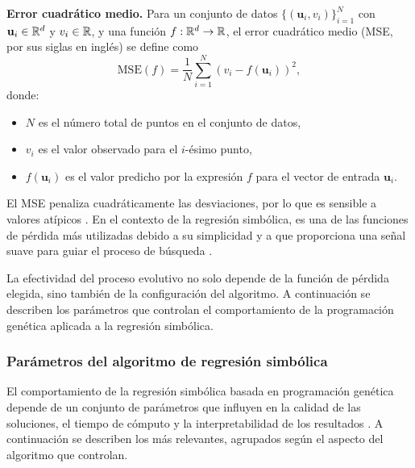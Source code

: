\documentclass[12pt,a4paper]{article} \usepackage[utf8]{inputenc} \usepackage[spanish]{babel} \usepackage{amsmath, amssymb, amsthm} \usepackage{bm} \usepackage{float} \usepackage{longtable} \usepackage[hidelinks]{hyperref}
\begin{document}
\textbf{Error cuadrático medio.} Para un conjunto de datos \(\{(\mathbf{u}_i, v_i)\}_{i=1}^{N}\) con \(\mathbf{u}_i \in \mathbb{R}^d\) y \(v_i \in \mathbb{R}\), y una función \(f: \mathbb{R}^d \to \mathbb{R}\), el error cuadrático medio (MSE, por sus siglas en inglés) se define como
\begin{equation}
 \text{MSE}(f) = \frac{1}{N} \sum_{i=1}^{N} \left( v_i - f(\mathbf{u}_i) \right)^2,
\end{equation}
donde:
\begin{itemize}
 \item \(N\) es el número total de puntos en el conjunto de datos, \item \(v_i\) es el valor observado para el \(i\)-ésimo punto, \item \(f(\mathbf{u}_i)\) es el valor predicho por la expresión \(f\) para el vector de entrada \(\mathbf{u}_i\).
\end{itemize}
El MSE penaliza cuadráticamente las desviaciones, por lo que es sensible a valores atípicos \cite{hastie2009elements}. En el contexto de la regresión simbólica, es una de las funciones de pérdida más utilizadas debido a su simplicidad y a que proporciona una señal suave para guiar el proceso de búsqueda \cite{bishop2006pattern}.

La efectividad del proceso evolutivo no solo depende de la función de pérdida elegida, sino también de la configuración del algoritmo. A continuación se describen los parámetros que controlan el comportamiento de la programación genética aplicada a la regresión simbólica.

\subsubsection{Parámetros del algoritmo de regresión simbólica}

El comportamiento de la regresión simbólica basada en programación genética depende de un conjunto de parámetros que influyen en la calidad de las soluciones, el tiempo de cómputo y la interpretabilidad de los resultados \cite{cranmer2023pysr}. A continuación se describen los más relevantes, agrupados según el aspecto del algoritmo que controlan.
\end{document}
